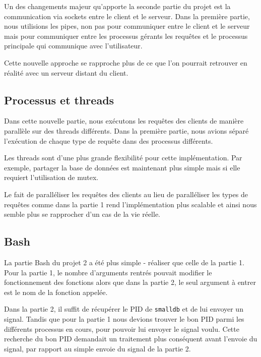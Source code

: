 \documentclass[utf8]{article}
\begin{document}
Un des changements majeur qu'apporte la seconde partie du projet est la communication via sockets entre le client et le serveur. Dans la première partie, nous utilisions les pipes, non pas pour communiquer entre le client et le serveur mais pour communiquer entre les processus gérants les requêtes et le processus principale qui communique avec l'utilisateur.

Cette nouvelle approche se rapproche plus de ce que l'on pourrait retrouver en réalité avec un serveur distant du client.


\subsection{Processus et threads}

Dans cette nouvelle partie, nous exécutons les requêtes des clients de manière parallèle sur des threads différents. Dans la première partie, nous avions séparé l'exécution de chaque type de requête dans des processus différents.

Les threads sont d'une plus grande flexibilité pour cette implémentation. Par exemple, partager la base de données est maintenant plus simple mais si elle requiert l'utilisation de mutex.

Le fait de paralléliser les requêtes des clients au lieu de paralléliser les types de requêtes comme dans la partie 1 rend l'implémentation plus scalable et ainsi nous semble plus se rapprocher d'un cas de la vie réelle.


\subsection{Bash}

La partie Bash du projet 2  a été plus simple - réaliser que celle de la partie 1.
Pour la partie 1, le nombre d'arguments rentrés pouvait modifier le fonctionnement des fonctions alors que dans la partie 2, le seul argument à entrer est le nom de la fonction appelée.

Dans la partie 2, il suffit de récupérer le PID de \texttt{smalldb} et de lui envoyer un signal. Tandis que pour la partie 1 nous devions trouver le bon PID parmi les différents processus en cours, pour pouvoir lui envoyer le signal voulu. Cette recherche du bon PID demandait un traitement plus conséquent avant l'envoie du signal, par rapport au simple envoie du signal de la partie 2. 
\end{document}
